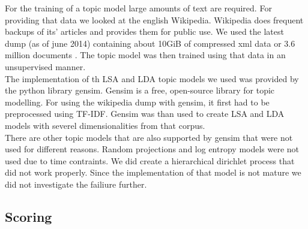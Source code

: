 For the training of a topic model large amounts of text are required. For providing that data we looked at the english Wikipedia. Wikipedia does frequent backups of its' articles and provides them for public use. We used the latest dump (as of june 2014) containing about 10GiB of compressed xml data or 3.6 million documents \cite{wikidumps}. The topic model was then trained using that data in an unsupervised manner.\\
The implementation of th LSA and LDA topic models we used was provided by the python library gensim. Gensim is a free, open-source library for topic modelling. For using the wikipedia dump with gensim, it first had to be preprocessed using TF-IDF. Gensim was than used to create LSA and LDA models with severel dimensionalities from that corpus.\\
There are other topic models that are also supported by gensim that were not used for different reasons. Random projections \cite{RandomProjections, gensimRP} and log entropy \cite{LogEntropy, gensimLE} models were not used due to time contraints. We did create a hierarchical dirichlet process \cite{hdp, gensimHdp} that did not work properly. Since the implementation of that model is not mature \cite{gensimHdp} we did not investigate the failiure further.





\subsection{Scoring}


